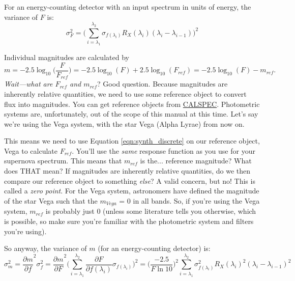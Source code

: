 For an energy-counting detector with an input spectrum in units of energy, the variance of $F$ is:
\begin{equation}
\label{eqn:varenergy}
    \sigma_{F}^{2} = \Big( \sum_{i=\lambda_{1}}^{\lambda_{2}} \sigma_{f(\lambda_{i})} R_{X}(\lambda_{i})(\lambda_{i} - \lambda_{i-1}) \Big)^{2}
\end{equation}

Individual magnitudes are calculated by
\begin{equation}
    m = -2.5\log_{10}\Big(\frac{F}{F_{ref}}\Big) = -2.5\log_{10}(F) + 2.5\log_{10}(F_{ref}) = -2.5\log_{10}(F) - m_{ref}.
\end{equation}
\textit{Wait---what are $F_{ref}$ and $m_{ref}$}? Good question. Because magnitudes are inherently relative quantities, we need to use some reference object to convert flux into magnitudes. You can get reference objects from \href{https://www.stsci.edu/hst/instrumentation/reference-data-for-calibration-and-tools/astronomical-catalogs/calspec}{CALSPEC}. Photometric systems are, unfortunately, out of the scope of this manual at this time. Let's say we're using the Vega system, with the star Vega (Alpha Lyrae) from now on. 

This means we need to use Equation \ref{eqn:synth_discrete} on our reference object, Vega to calculate $F_{ref}$. You'll use the \textit{same} response function as you use for your supernova spectrum. This means that $m_{ref}$ is the... reference magnitude? What does THAT mean? If magnitudes are inherently relative quantities, do we then compare our reference object to something \textit{else}? A valid concern, but no! This is called a \textit{zero point}. For the Vega system, astronomers have defined the magnitude of the star Vega such that the $m_{Vega}$ = 0 in all bands. So, if you're using the Vega system, $m_{ref}$ is probably just 0 (unless some literature tells you otherwise, which is possible, so make sure you're familiar with the photometric system and filters you're using).

So anyway, the variance of $m$ (for an energy-counting detector) is:
\begin{equation}
    \sigma_{m}^{2} = \frac{\partial m}{\partial f}^{2} \sigma_{f}^{2} = \frac{\partial m}{\partial F}^{2} \Big( \sum_{i=\lambda_{1}}^{\lambda_{2}} \frac{\partial F}{\partial f(\lambda_{i})} \sigma_{f(\lambda_{i})}\Big)^{2} = \Big( \frac{-2.5}{F\ln10} \Big)^{2} \sum_{i=\lambda_{1}}^{\lambda_{2}}\sigma_{f(\lambda_{i})}^{2} R_{X}(\lambda_{i})^{2}(\lambda_{i}-\lambda_{i-1})^{2}
    \label{eqn:m_err}
\end{equation}


